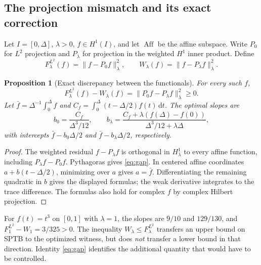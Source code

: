 \documentclass[11pt,letterpaper]{article}
\newtheorem{proposition}[theorem]{Proposition}
\newcommand{\dd}{\,\mathrm d}
\begin{document}
\subsection{The projection mismatch and its exact correction}
Let $I=[0,\Delta]$, $\lambda>0$, $f\in H^1(I)$, and let $\operatorname{Aff}$
be the affine subspace. Write $P_0$ for $L^2$ projection and $P_\lambda$
for projection in the weighted $H^1$ inner product. Define
\[
F_\lambda^{L^2}(f)=\|f-P_0f\|_\lambda^2,\qquad
W_\lambda(f)=\|f-P_\lambda f\|_\lambda^2.
\]
\begin{proposition}[Exact discrepancy between the functionals]\label{prop:gap}
For every such $f$,
\begin{equation}\label{eq:gap}
F_\lambda^{L^2}(f)-W_\lambda(f)
=\|P_0f-P_\lambda f\|_\lambda^2\ge0.
\end{equation}
Let $\bar f=\Delta^{-1}\int_0^\Delta f$ and
$C_f=\int_0^\Delta(t-\Delta/2)f(t)\dd t$. The optimal slopes are
\[
b_0=\frac{C_f}{\Delta^3/12},\qquad
b_\lambda=\frac{C_f+\lambda(f(\Delta)-f(0))}
{\Delta^3/12+\lambda\Delta},
\]
with intercepts $\bar f-b_0\Delta/2$ and
$\bar f-b_\lambda\Delta/2$, respectively.
\end{proposition}
\begin{proof}
The weighted residual $f-P_\lambda f$ is orthogonal in $H^1_\lambda$
to every affine function, including $P_\lambda f-P_0f$.
Pythagoras gives \eqref{eq:gap}. In centered affine coordinates
$a+b(t-\Delta/2)$, minimizing over $a$ gives $a=\bar f$.
Differentiating the remaining quadratic in $b$ gives the displayed
formulas; the weak derivative integrates to the trace difference.
The formulas also hold for complex $f$ by complex Hilbert projection.
\end{proof}
For $f(t)=t^3$ on $[0,1]$ with $\lambda=1$, the slopes are
$9/10$ and $129/130$, and $F_1^{L^2}-W_1=3/325>0$.
The inequality $W_\lambda\le F_\lambda^{L^2}$ transfers an upper bound
on SPTB to the optimized witness, but does \emph{not} transfer a lower
bound in that direction. Identity \eqref{eq:gap} identifies the
additional quantity that would have to be controlled.
\end{document}
